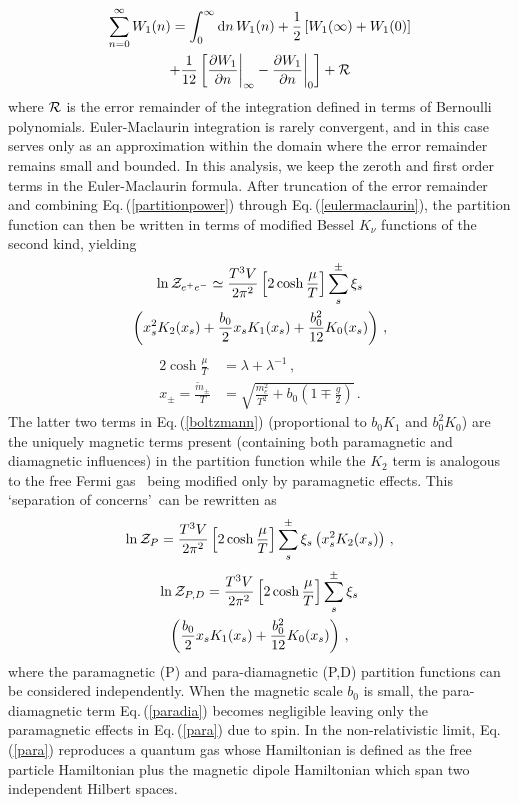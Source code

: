 \documentclass[reprint]{revtex4-2}
\newcommand{\req}[1]{Eq.\,(\ref{#1})}
\begin{document}
\begin{multline}
    \label{eulermaclaurin}
    \sum_{n=0}^{\infty}W_{1}(n)=\int_{0}^{\infty}{\rm d}n\,W_{1}(n)+\frac{1}{2}\left[W_{1}(\infty)+W_{1}(0)\right]\\
    +\frac{1}{12}\left[\frac{\partial W_{1}}{\partial n}\bigg\vert_{\infty}-\frac{\partial W_{1}}{\partial n}\bigg\vert_{0}\right]+{\cal R}
\end{multline}
where ${\cal R}$ is the error remainder of the integration defined in terms of Bernoulli polynomials. Euler-Maclaurin integration is rarely convergent, and in this case serves only as an approximation within the domain where the error remainder remains small and bounded. In this analysis, we keep the zeroth and first order terms in the Euler-Maclaurin formula. After truncation of the error remainder and combining \req{partitionpower} through \req{eulermaclaurin}, the partition function can then be written in terms of modified Bessel $K_{\nu}$ functions of the second kind, yielding
\begin{multline}
    \label{boltzmann}
    \ln{\cal Z}_{e^{+}e^{-}}\simeq\frac{T^{3}V}{2\pi^{2}}\left[2\cosh{\frac{\mu}{T}}\right]\sum_{s}^{\pm}\xi_{s}\\
    \left(x_{s}^{2}K_{2}(x_{s})+\frac{b_{0}}{2}x_{s}K_{1}(x_{s})+\frac{b_{0}^{2}}{12}K_{0}(x_{s})\right)\,,
\end{multline}
\begin{align}
    \label{xfunc}
    2\cosh{\frac{\mu}{T}}&=\lambda+\lambda^{-1}\,,\\
    x_{\pm}=\frac{{\tilde m}_{\pm}}{T}&=\sqrt{\frac{m_{e}^{2}}{T^{2}}+b_{0}\left(1\mp\frac{g}{2}\right)}\,.
\end{align}
The latter two terms in \req{boltzmann} (proportional to $b_{0}K_{1}$ and $b_{0}^{2}K_{0}$) are the uniquely magnetic terms present (containing both paramagnetic and diamagnetic influences) in the partition function while the $K_{2}$ term is analogous to the free Fermi gas~\cite{greiner2012thermodynamics} being modified only by paramagnetic effects. This \lq separation of concerns\rq\ can be rewritten as
\begin{align}
    \label{para}
    \ln{\cal Z}_{P}=\frac{T^{3}V}{2\pi^{2}}\left[2\cosh{\frac{\mu}{T}}\right]\sum_{s}^{\pm}\xi_{s}\left(x_{s}^{2}K_{2}(x_{s})\right)\,,
\end{align}
\begin{multline}
    \label{paradia}
    \ln{\cal Z}_{P,D}=\frac{T^{3}V}{2\pi^{2}}\left[2\cosh{\frac{\mu}{T}}\right]\sum_{s}^{\pm}\xi_{s}\\
    \left(\frac{b_{0}}{2}x_{s}K_{1}(x_{s})+\frac{b_{0}^{2}}{12}K_{0}(x_{s})\right)\,,
\end{multline}
where the paramagnetic (P) and para-diamagnetic (P,D) partition functions can be considered independently. When the magnetic scale $b_{0}$ is small, the para-diamagnetic term \req{paradia} becomes negligible leaving only the paramagnetic effects in \req{para} due to spin. In the non-relativistic limit, \req{para} reproduces a quantum gas whose Hamiltonian is defined as the free particle Hamiltonian plus the magnetic dipole Hamiltonian which span two independent Hilbert spaces.
\end{document}
